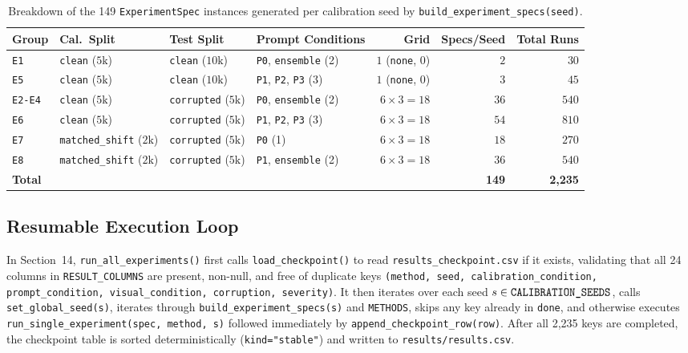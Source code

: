 \documentclass[11pt,a4paper]{article}
\begin{document}
\begin{table}[!htbp]
\centering
\caption{Breakdown of the 149 \texttt{ExperimentSpec} instances generated per calibration seed by \texttt{build\_\allowbreak{}experiment\_\allowbreak{}specs(seed)}.}
\label{tab:exp_matrix}
\footnotesize\begin{tabularx}{\textwidth}{l l l Y r r r}
\toprule
\textbf{Group} & \textbf{Cal.\ Split} & \textbf{Test Split} & \textbf{Prompt Conditions} & \textbf{Grid} & \textbf{Specs/Seed} & \textbf{Total Runs} \\
\midrule
\texttt{E1} & \texttt{clean} ($5\text{k}$) & \texttt{clean} ($10\text{k}$) & \texttt{P0}, \texttt{ensemble} (2) & $1$ (\texttt{none}, 0) & $2$ & $30$ \\
\texttt{E5} & \texttt{clean} ($5\text{k}$) & \texttt{clean} ($10\text{k}$) & \texttt{P1}, \texttt{P2}, \texttt{P3} (3) & $1$ (\texttt{none}, 0) & $3$ & $45$ \\
\texttt{E2-E4} & \texttt{clean} ($5\text{k}$) & \texttt{corrupted} ($5\text{k}$) & \texttt{P0}, \texttt{ensemble} (2) & $6 \times 3 = 18$ & $36$ & $540$ \\
\texttt{E6} & \texttt{clean} ($5\text{k}$) & \texttt{corrupted} ($5\text{k}$) & \texttt{P1}, \texttt{P2}, \texttt{P3} (3) & $6 \times 3 = 18$ & $54$ & $810$ \\
\texttt{E7} & \texttt{matched\_\allowbreak{}shift} ($2\text{k}$) & \texttt{corrupted} ($5\text{k}$) & \texttt{P0} (1) & $6 \times 3 = 18$ & $18$ & $270$ \\
\texttt{E8} & \texttt{matched\_\allowbreak{}shift} ($2\text{k}$) & \texttt{corrupted} ($5\text{k}$) & \texttt{P1}, \texttt{ensemble} (2) & $6 \times 3 = 18$ & $36$ & $540$ \\
\midrule
\textbf{Total} & & & & & \textbf{149} & \textbf{2,235} \\
\bottomrule
\end{tabularx}
\end{table}

\subsection{Resumable Execution Loop}
In Section~14, \texttt{run\_\allowbreak{}all\_\allowbreak{}experiments()} first calls \texttt{load\_\allowbreak{}checkpoint()} to read \texttt{results\_\allowbreak{}checkpoint.csv} if it exists, validating that all 24 columns in \texttt{RESULT\_\allowbreak{}COLUMNS} are present, non-null, and free of duplicate keys \texttt{(method, seed, calibration\_\allowbreak{}condition, prompt\_\allowbreak{}condition, visual\_\allowbreak{}condition, corruption, severity)}. It then iterates over each seed $s \in \text{\texttt{CALIBRATION\_\allowbreak{}SEEDS}}$, calls \texttt{set\_\allowbreak{}global\_\allowbreak{}seed(s)}, iterates through \texttt{build\_\allowbreak{}experiment\_\allowbreak{}specs(s)} and \texttt{METHODS}, skips any key already in \texttt{done}, and otherwise executes \texttt{run\_\allowbreak{}single\_\allowbreak{}experiment(spec, method, s)} followed immediately by \texttt{append\_\allowbreak{}checkpoint\_\allowbreak{}row(row)}. After all 2,235 keys are completed, the checkpoint table is sorted deterministically (\texttt{kind="stable"}) and written to \texttt{results/\allowbreak{}results.csv}.
\end{document}
